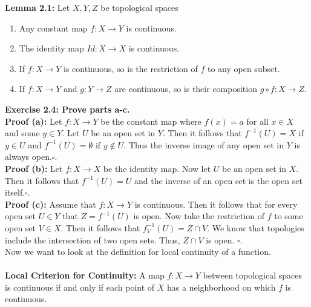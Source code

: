 \documentclass{article}
\begin{document}
 \textbf{Lemma 2.1:} Let $X,Y,Z$ be topological spaces\\
 \begin{enumerate}
     \item Any constant map $f:X\to Y$ is continuous.
     \item The identity map $Id: X\to X$ is continuous.
     \item If $f:X\to Y$ is continuous, so is the restriction of $f$ to any open subset.
     \item If $f:X\to Y$ and $g:Y\to Z$ are continuous, so is their composition $g\circ f:X\to Z$.
 \end{enumerate}
\vspace{\baselineskip}
\textbf{Exercise 2.4: Prove parts a-c.}\\
\textbf{Proof (a):} Let $f:X\to Y$ be the constant map where $f(x) = a$ for all $x\in X$ and some $y\in Y$. Let $U$ be an open set in $Y$. Then it follows that $f^{-1}(U)=X$ if $y\in U$ and $f^{-1}(U) = \emptyset$ if $y\notin U$. Thus the inverse image of any open set in $Y$ is always open.$\square$.\\
\textbf{Proof (b):} Let $f:X\to X$ be the identity map. Now let $U$ be an open set in $X$. Then it follows that $f^{-1}(U)=U$ and the inverse of an open set is the open set itself.$\square$.\\
\textbf{Proof (c):} Assume that $f:X\to Y$ is continuous. Then it follows that for every open set $U\in Y$ that $Z=f^{-1}(U)$ is open. Now take the restriction of $f$ to some open set $V\in X$. Then it follows that $f^{-1}_V(U) = Z \cap V$. We know that topologies include the intersection of two open sets. Thus, $Z\cap V$ is open. $\square.$\\

Now we want to look at the definition for local continuity of a function.\\
\\
\textbf{Local Criterion for Continuity:} A map $f:X\to Y$ between topological spaces is continuous if and only if each point of $X$ has a neighborhood on which $f$ is continuous.
\end{document}
